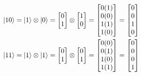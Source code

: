 \documentclass{article}
\begin{document}
\begin{align*}
\begin{split}
        \ket{10} &= \ket{1} \otimes \ket{0} = \begin{bmatrix} 0 \\ 1 \end{bmatrix} \otimes \begin{bmatrix} 1 \\ 0 \end{bmatrix} = \begin{bmatrix} 0(1) \\ 0(0) \\ 1(1) \\ 1(0) \end{bmatrix} = \begin{bmatrix} 0 \\ 0 \\ 1 \\ 0  \end{bmatrix}\\
        \ket{11} &= \ket{1} \otimes \ket{1} = \begin{bmatrix} 0 \\ 1 \end{bmatrix} \otimes \begin{bmatrix} 0 \\ 1 \end{bmatrix} = \begin{bmatrix} 0(0) \\ 0(1) \\ 1(0) \\ 1(1) \end{bmatrix} = \begin{bmatrix} 0 \\ 0 \\ 0 \\ 1 \end{bmatrix}\\
    \end{split}
\end{align*}
\end{document}

